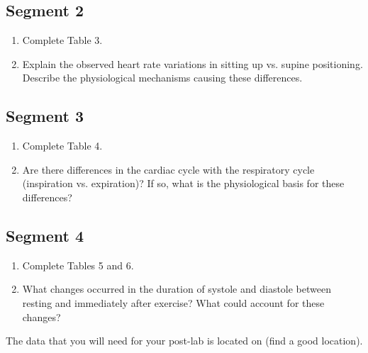 \documentclass{article}
\begin{document}
\subsection*{Segment 2}
\begin{enumerate}
	\item Complete Table 3.
	\item Explain the observed heart rate variations in sitting up vs. supine positioning. Describe the physiological mechanisms causing these differences.
\end{enumerate}

\subsection*{Segment 3}
\begin{enumerate}
	\item Complete Table 4.
	\item Are there differences in the cardiac cycle with the respiratory cycle (inspiration vs. expiration)? If so, what is the physiological basis for these differences?
\end{enumerate}

\subsection*{Segment 4}
\begin{enumerate}
	\item Complete Tables 5 and 6.
	\item What changes occurred in the duration of systole and diastole between resting and immediately after exercise? What could account for these changes?
\end{enumerate}

\begin{warn}
	The data that you will need for your post-lab is located on (find a good location).
\end{warn}
\end{document}
